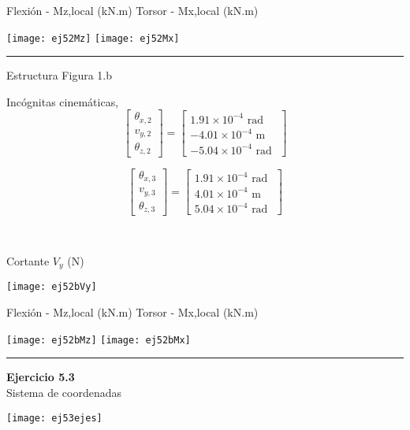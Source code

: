 Flexión - Mz,local (kN.m) \hfill  Torsor - Mx,local (kN.m)

\texttt{[image: ej52Mz]}
\texttt{[image: ej52Mx]}


\hrule 

\vspace{5mm}
Estructura Figura 1.b



\begin{minipage}{0.45\textwidth}
	Incógnitas cinemáticas,
	$$
	\left[
	\begin{matrix}
	\theta_{x,2} \\
	v_{y,2} \\
	\theta_{z,2}
	\end{matrix}
	\right]
	=
	\left[
	\begin{matrix}
	 1.91\times 10^{-4} \text{ rad }\\
	-4.01\times 10^{-4} \text{ m }\\
	-5.04\times 10^{-4} \text{ rad }
	\end{matrix}
	\right]
	$$
	
	$$
	\left[
	\begin{matrix}
	\theta_{x,3} \\
	v_{y,3} \\
	\theta_{z,3}
	\end{matrix}
	\right]
	=
	\left[
	\begin{matrix}
	 1.91\times 10^{-4} \text{ rad }\\
	 4.01\times 10^{-4} \text{ m }\\
	 5.04\times 10^{-4} \text{ rad }
	\end{matrix}
	\right]
	$$
\end{minipage}
~
\begin{minipage}{0.45\textwidth}
	Cortante $V_y$ (N)
	
	\texttt{[image: ej52bVy]}
\end{minipage}


Flexión - Mz,local (kN.m) \hfill Torsor - Mx,local (kN.m)

\texttt{[image: ej52bMz]}
\texttt{[image: ej52bMx]}



\hrule 
\vspace{5mm}
\textbf{Ejercicio 5.3}\\



Sistema de coordenadas
\begin{center}
	\texttt{[image: ej53ejes]}
\end{center}




